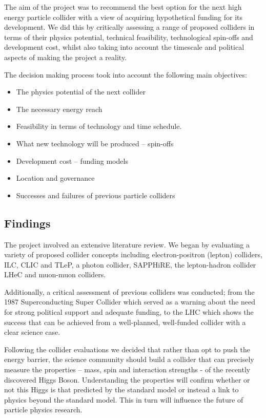 The aim of the project was to recommend the best option for the next high energy particle collider with a view of acquiring hypothetical funding for its development. We did this by critically assessing a range of proposed colliders in terms of their physics potential, technical feasibility, technological spin-offs and development cost, whilst also taking into account the timescale and political aspects of making the project a reality.

The decision making process took into account the following main objectives:

\begin{itemize}
	\item The physics potential of the next collider
    \item The necessary energy reach
    \item Feasibility in terms of technology and time schedule.
    \item What new technology will be produced – spin-offs
    \item Development cost – funding models
    \item Location and governance
    \item Successes and failures of previous particle colliders
\end{itemize}

\subsection{Findings}

The project involved an extensive literature review. We began by evaluating a variety of proposed collider concepts including electron-positron (lepton) colliders, ILC, CLIC and TLeP, a photon collider, SAPPHiRE, the lepton-hadron collider LHeC and muon-muon colliders.

Additionally, a critical assessment of previous colliders was conducted; from the 1987 Superconducting Super Collider which served as a warning about the need for strong political support and adequate funding, to the LHC which shows the success that can be achieved from a well-planned, well-funded collider with a clear science case.

Following the collider evaluations we decided that rather than opt to push the energy barrier, the science community should build a collider that can precisely measure the properties – mass, spin and interaction strengths - of the recently discovered Higgs Boson. Understanding the properties will confirm whether or not this Higgs is that predicted by the standard model or instead a link to physics beyond the standard model. This in turn will influence the future of particle physics research.

